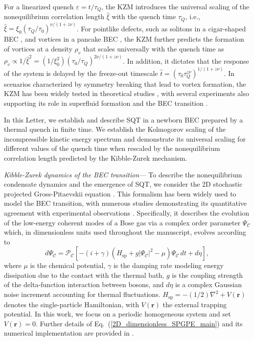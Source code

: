 \documentclass[aps,prl,twocolumn,showpacs,notitlepage,floatfix,superscriptaddress]{revtex4-1}
\begin{document}
For a linearized quench $\varepsilon=t/\tau_Q$, the KZM introduces the universal scaling of the nonequilibrium correlation length $\hat\xi$ with the quench time $\tau_Q$, i.e., $\hat\xi=\xi_0(\tau_Q/\tau_0)^{\nu/(1+z\nu)}$. For pointlike defects, such as solitons in a cigar-shaped BEC \cite{Damski_soliton_2010,Lamporesi13}, and vortices in a pancake BEC \cite{Weiler08,Chomaz15}, the KZM further predicts the formation of vortices at a density $\rho_{v}$ that scales universally with the quench time 
as $\rho_v  
\propto 1 / \hat{\xi}^2=\left( 1 / \xi_0^2 \right) \left( \tau_0 / \tau_Q \right)^{2 \nu/(1+z\nu)}$.
In addition, it dictates that the response of the system is delayed by the freeze-out timescale $\hat{t}=(\tau_0 \tau_Q^{z\nu})^{1/(1+z\nu)}$. In scenarios characterized by 
symmetry breaking that lead to vortex formation, the KZM has been widely tested in theoretical studies \cite{DRP11,Chesler15,Liu2020,Zeng23,Thudiyangal24,Wheeler2025,Kirkby2025}, with several experiments also supporting its role in superfluid formation and the BEC transition \cite{Ruutu1996,Weiler08,Navon15,Shin19,KimShin22}. 

In this Letter, we establish and describe SQT in a newborn BEC prepared by a thermal quench in finite time. We establish the Kolmogorov scaling of the incompressible kinetic energy 
spectrum and demonstrate its universal scaling for different values of the quench time when rescaled by the nonequilibrium correlation length predicted by the Kibble-Zurek mechanism. 

{\it Kibble-Zurek dynamics of the BEC transition---}
To describe the nonequilibrium condensate dynamics and the emergence of SQT, we consider the 
2D stochastic projected Gross-Pitaevskii equation \cite{Gardiner2003,blakie2008dynamics,Rooney2012,Rooney2014,Bradley2015,McDonald2020}. 
This formalism has been widely used to model the BEC transition, with numerous studies demonstrating its quantitative agreement with experimental observations \cite{Weiler08,Liu2020}.
Specifically, it describes the evolution of the low-energy coherent modes of a Bose gas via a complex order parameter $\Psi_{\mathcal{C}}$ which, 
in dimensionless units used throughout the manuscript, 
evolves according to 
\begin{equation}\label{2D_dimensionless_SPGPE_main}
    d{\Psi_{\mathcal{C}}} = \mathcal{P}_{\mathcal{C}} \left[ -(i + \gamma) \left( H_{\textrm{sp}} + g |\Psi_{\mathcal{C}}|^{2} -\mu\right) \Psi_{\mathcal{C}} \, dt + d \eta \right], 
\end{equation}
where $\mu$ is the chemical potential, $\gamma$ is the damping rate modeling energy dissipation due to the contact with the thermal bath, $g$ is the coupling strength of the delta-function interaction between bosons, and $d\eta$ is a complex Gaussian noise increment accounting for thermal fluctuations.
$H_{\textrm{sp}} = - \left( 1 / 2 \right) \nabla^{2} + V(\boldsymbol{r})$ denotes the single-particle Hamiltonian, with $V(\boldsymbol{r})$ the external trapping potential. In this work, we focus on a periodic homogeneous system and set $V(\boldsymbol{r})=0$. Further details of Eq.~(\ref{2D_dimensionless_SPGPE_main}) and its numerical implementation are provided in \cite{SM}. 
\end{document}
